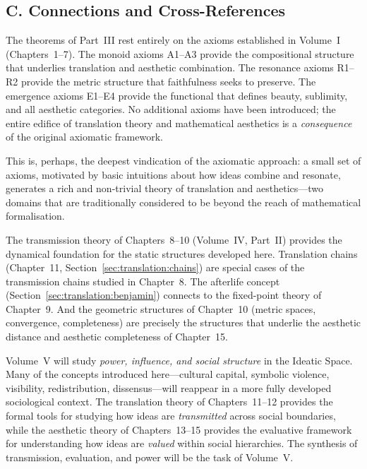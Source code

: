 \subsection*{C. Connections and Cross-References}

\begin{remark}
The theorems of Part~III rest entirely on the axioms established in
Volume~I (Chapters~1--7).  The monoid axioms A1--A3 provide the
compositional structure that underlies translation and aesthetic
combination.  The resonance axioms R1--R2 provide the metric structure
that faithfulness seeks to preserve.  The emergence axioms E1--E4
provide the functional that defines beauty, sublimity, and all
aesthetic categories.  No additional axioms have been introduced;
the entire edifice of translation theory and mathematical aesthetics
is a \emph{consequence} of the original axiomatic framework.

This is, perhaps, the deepest vindication of the axiomatic approach:
a small set of axioms, motivated by basic intuitions about how ideas
combine and resonate, generates a rich and non-trivial theory of
translation and aesthetics---two domains that are traditionally
considered to be beyond the reach of mathematical formalisation.
\end{remark}

\begin{remark}
The transmission theory of Chapters~8--10 (Volume~IV, Part~II) provides
the dynamical foundation for the static structures developed here.
Translation chains (Chapter~11, Section~\ref{sec:translation:chains})
are special cases of the transmission chains studied in Chapter~8.
The afterlife concept (Section~\ref{sec:translation:benjamin}) connects
to the fixed-point theory of Chapter~9.  And the geometric structures
of Chapter~10 (metric spaces, convergence, completeness) are precisely
the structures that underlie the aesthetic distance and aesthetic
completeness of Chapter~15.
\end{remark}

\begin{remark}
Volume~V will study \emph{power, influence, and social structure} in the
Ideatic Space.  Many of the concepts introduced here---cultural capital,
symbolic violence, visibility, redistribution, dissensus---will reappear
in a more fully developed sociological context.  The translation theory
of Chapters~11--12 provides the formal tools for studying how ideas are
\emph{transmitted} across social boundaries, while the aesthetic theory
of Chapters~13--15 provides the evaluative framework for understanding
how ideas are \emph{valued} within social hierarchies.  The synthesis
of transmission, evaluation, and power will be the task of Volume~V.
\end{remark}

